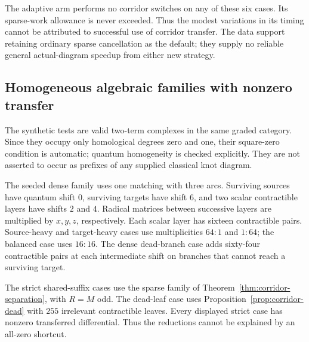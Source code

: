 The adaptive arm performs no corridor switches on any of these six
cases. Its sparse-work allowance is never exceeded. Thus the modest
variations in its timing cannot be attributed to successful use of
corridor transfer. The data support retaining ordinary sparse
cancellation as the default; they supply no reliable general
actual-diagram speedup from either new strategy.

\subsection{Homogeneous algebraic families with nonzero transfer}

The synthetic tests are valid two-term complexes in the same
graded category. Since they occupy only homological degrees zero
and one, their square-zero condition is automatic; quantum
homogeneity is checked explicitly. They are not asserted to occur
as prefixes of any supplied classical knot diagram.

The seeded dense family uses one matching with three arcs.
Surviving sources have quantum shift \(0\), surviving targets have
shift \(6\), and two scalar contractible layers have shifts \(2\)
and \(4\). Radical matrices between successive layers are
multiplied by \(x,y,z\), respectively. Each scalar layer has
sixteen contractible pairs. Source-heavy and target-heavy cases
use multiplicities \(64:1\) and \(1:64\); the balanced case uses
\(16:16\). The dense dead-branch case adds sixty-four contractible
pairs at each intermediate shift on branches that cannot reach a
surviving target.

The strict shared-suffix cases use the sparse family of
Theorem~\ref{thm:corridor-separation}, with \(R=M\) odd. The
dead-leaf case uses Proposition~\ref{prop:corridor-dead} with
\(255\) irrelevant contractible leaves. Every displayed strict
case has nonzero transferred differential. Thus the reductions
cannot be explained by an all-zero shortcut.

